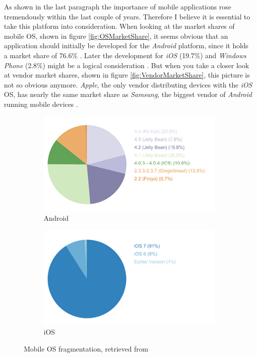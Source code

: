 As shown in the last paragraph the importance of mobile applications rose tremendously within the last couple of years. Therefore I believe it is essential to take this platform into consideration. When looking at the market shares of mobile \gls{OS}, shown in figure \vref{fig:OSMarketShare}, it seems obvious that an application should initially be developed for the \emph{Android} platform, since it holds a market share of 76.6\% \cite{IDC:2015aa}. Later the development for \emph{iOS} (19.7\%) and \emph{Windows Phone} (2.8\%) might be a logical consideration \cite{IDC:2015aa}. But when you take a closer look at vendor market shares, shown in figure \vref{fig:VendorMarketShare}, this picture is not so obvious anymore. \emph{Apple}, the only vendor distributing devices with the \emph{iOS} \gls{OS}, has nearly the same market share as \emph{Samsung}, the biggest vendor of \emph{Android} running mobile devices \cite{IDC:2015ab}.

\begin{figure}[h]
	\centering
	\begin{subfigure}{.49\textwidth}
  		\centering
  		\includegraphics[width=0.98\linewidth]{./images/android-os.png}
  		\caption{Android}
  		\label{fig:AndroidOSFragmentation}
	\end{subfigure}
	\begin{subfigure}{.49\textwidth}
  		\centering
  		\includegraphics[width=0.98\linewidth]{./images/ios-os.png}
  		\caption{iOS}
  		\label{fig:iOSOSFragmentation}
	\end{subfigure}
	\caption{Mobile \gls{OS} fragmentation, retrieved from \cite{OpenSignal:2014aa}}
	\label{fig:MobileOSFragmentation}
\end{figure}
\nocite{OpenSignal:2014aa}

